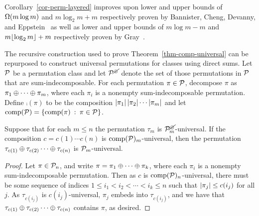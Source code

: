 Corollary~\ref{cor-perm-layered} improves upon lower and upper bounds of $\oOmega{m \log m}$ and $m \log_2 m + m$ respectively proven by Bannister, Cheng, Devanny, and Eppstein~\cite{bannister:superpatterns-a:} as well as lower and upper bounds of $m \log m - m$ and $m \floor{\log_2 m} + m$ respectively proven by Gray~\cite{gray:bounds-on-super:}.


The recursive construction used to prove Theorem~\ref{thm-comp-universal} can be repurposed to construct universal permutations for classes using direct sums. Let $\P$ be a permutation class and let $\P^{\sumind}$ denote the set of those permutations in $\P$ that are sum-indecomposable. For each permutation $\pi \in \P$, decompose $\pi$ as $\pi_{1} \directsum \cdots \directsum \pi_{m}$, where each $\pi_i$ is a nonempty sum-indecomposable permutation. Define $\comp(\pi)$ to be the composition $\size{\pi_{1}} \size{\pi_{2}} \cdots \size{\pi_{m}}$ and let $\comp(\P) = \{\comp(\pi) \st \pi \in \P\}$.

\begin{proposition}
\label{prop-an-upper-bound}
	Suppose that for each $m \le n$ the permutation $\tau_m$ is $\P^{\sumind}_m$-universal. If the composition $c = c(1) \cdots c(n)$ is $\comp(\P)_m$-universal, then the permutation $\tau_{c(1)} \directsum \tau_{c(2)} \cdots \directsum \tau_{c(n)}$ is $\P_m$-universal.
\end{proposition}
\begin{proof}
	Let $\pi \in \P_n$, and write $\pi = \pi_{1} \directsum \cdots \directsum \pi_{k}$, where each $\pi_{i}$ is a nonempty sum-indecomposable permutation. Then as $c$ is $\comp(\P)_n$-universal, there must be some sequence of indices $1 \le i_1 < i_2 < \cdots < i_k \le n$ such that $\size{\pi_{j}} \le c(i_j)$ for all $j$. As $\tau_{c(i_j)}$ is $c(i_j)$-universal, $\pi_{j}$ embeds into $\tau_{c(i_j)}$, and we have that $\tau_{c(1)} \directsum \tau_{c(2)} \cdots \directsum \tau_{c(n)}$ contains $\pi$, as desired.
\end{proof}

